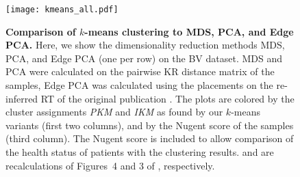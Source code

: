 \begin{figure}[p]
    \centering
    \texttt{[image: kmeans\_all.pdf]}
    \begin{subfigure}{0pt}
        \label{fig:kmeans_all:sub:mds_em}
    \end{subfigure}
    \begin{subfigure}{0pt}
        \label{fig:kmeans_all:sub:mds_ei}
    \end{subfigure}
    \begin{subfigure}{0pt}
        \label{fig:kmeans_all:sub:mds_ns}
    \end{subfigure}
    \begin{subfigure}{0pt}
        \label{fig:kmeans_all:sub:pca_em}
    \end{subfigure}
    \begin{subfigure}{0pt}
        \label{fig:kmeans_all:sub:pca_ei}
    \end{subfigure}
    \begin{subfigure}{0pt}
        \label{fig:kmeans_all:sub:pca_ns}
    \end{subfigure}
    \begin{subfigure}{0pt}
        \label{fig:kmeans_all:sub:epca_em}
    \end{subfigure}
    \begin{subfigure}{0pt}
        \label{fig:kmeans_all:sub:epca_ei}
    \end{subfigure}
    \begin{subfigure}{0pt}
        \label{fig:kmeans_all:sub:epca_ns}
    \end{subfigure}
    \caption[Comparison of $k$-means clustering to MDS, PCA, and Edge PCA]{
        \textbf{Comparison of $k$-means clustering to MDS, PCA, and Edge PCA.}
        Here, we show the dimensionality reduction methods MDS, PCA, and Edge PCA (one per row) on the \ac{BV} dataset.
        MDS and PCA were calculated on the pairwise KR distance matrix of the samples,
        Edge PCA was calculated using the placements on the re-inferred \ac{RT} of the original publication \cite{Srinivasan2012}.
        The plots are colored by the cluster assignments \emph{PKM} and \emph{IKM}
        as found by our $k$-means variants (first two columns), and by the Nugent score of the samples (third column).
        The Nugent score is included to allow comparison of the health status of patients with the clustering results.
         and  are recalculations of
        Figures~4 and 3 of \cite{Matsen2011b}, respectively.
    }
    \label{fig:kmeans_all}
\end{figure}

